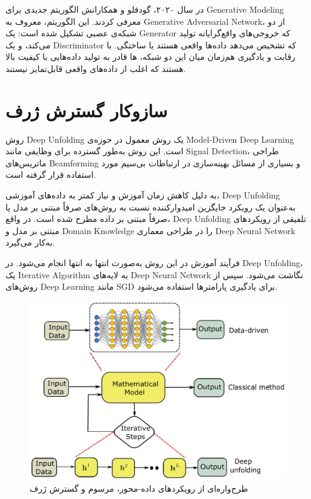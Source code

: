 در سال ۲۰۲۰، گودفلو و همکارانش الگوریتم جدیدی برای
\gls{Generative Modeling}
معرفی کردند. این الگوریتم، معروف به 
\gls{Generative Adversarial Network}،
از دو شبکه‌ی عصبی تشکیل شده است:
یک 
\gls{Generator}
که خروجی‌های واقع‌گرایانه تولید می‌کند، و یک 
\gls{Discriminator}
که تشخیص می‌دهد داده‌ها واقعی هستند یا ساختگی.
با رقابت و یادگیری هم‌زمان میان این دو شبکه، 
ها
قادر به تولید داده‌هایی با کیفیت بالا هستند که اغلب از داده‌های واقعی قابل‌تمایز نیستند.

\section{سازوکار گسترش ژرف}
روش 
\gls{Deep Unfolding}
یک روش معمول در حوزه‌ی 
\gls{Model-Driven Deep Learning}
است. این روش به‌طور گسترده برای وظایفی مانند 
\gls{Signal Detection}،
 طراحی ماتریس‌های 
\gls{Beamforming}
 و بسیاری از مسائل بهینه‌سازی در ارتباطات بی‌سیم مورد استفاده قرار گرفته است.

به دلیل کاهش زمان آموزش و نیاز کمتر به داده‌های آموزشی، 
\gls{Deep Unfolding}
به‌عنوان یک رویکرد جایگزین امیدوارکننده نسبت به روش‌های صرفاً مبتنی بر مدل یا صرفاً مبتنی بر داده مطرح شده است. در واقع، 
\gls{Deep Unfolding}
تلفیقی از رویکردهای مبتنی بر مدل و 
\gls{Domain Knowledge}
را در طراحی معماری 
\gls{Deep Neural Network}
به‌کار می‌گیرد.

فرآیند آموزش در این روش به‌صورت انتها به انتها انجام می‌شود. در 
\gls{Deep Unfolding}،
یک 
\gls{Iterative Algorithm}
به لایه‌های 
\gls{Deep Neural Network}
نگاشت می‌شود. سپس از روش‌های 
\gls{Deep Learning}
 مانند 
\gls{SGD}
 برای یادگیری پارامترها استفاده می‌شود.
\begin{figure}
	\centering
	\includegraphics[width=0.5\linewidth]{./Pic/ComprehensiveReview_concepts_fig2}
	\caption[ طرح‌واره‌ای از رویکردهای داده-محور، مرسوم و گسترش ژرف]{طرح‌واره‌ای از رویکردهای داده-محور، مرسوم و گسترش ژرف \cite{ComprehensiveReview}}
	\label{concepts:fig2}
\end{figure}

